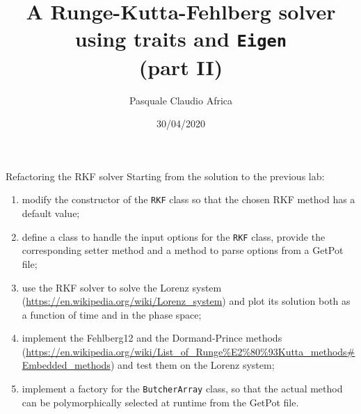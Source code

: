 \documentclass[10pt]{beamer}
\begin{document}
    \title{A Runge-Kutta-Fehlberg solver\protect\\using traits and \texttt{Eigen}\protect\\(part II)}
    \author{Pasquale Claudio Africa}
    \date{30/04/2020}

\begin{frame}
    \maketitle
\end{frame}

\begin{frame}{Refactoring the RKF solver}
Starting from the solution to the previous lab:
\begin{enumerate}
\item modify the constructor of the \texttt{RKF} class so that the chosen RKF method has a default value;
\item define a class to handle the input options for the \texttt{RKF} class, provide the corresponding setter method and a method to parse options from a GetPot file;
\item use the RKF solver to solve the Lorenz system (\url{https://en.wikipedia.org/wiki/Lorenz_system}) and plot its solution both as a function of time and in the phase space;
\item implement the Fehlberg12 and the Dormand-Prince methods (\url{https://en.wikipedia.org/wiki/List_of_Runge\%E2\%80\%93Kutta_methods\#Embedded_methods}) and test them on the Lorenz system;
\item implement a factory for the \texttt{ButcherArray} class, so that the actual method can be polymorphically selected at runtime from the GetPot file.
\end{enumerate}
\end{frame}
\end{document}
